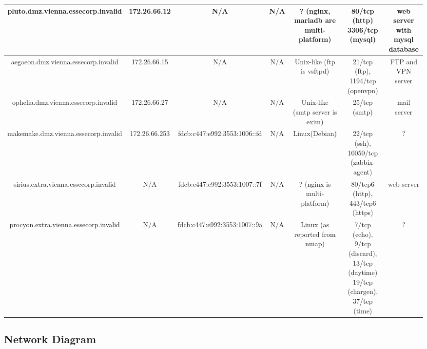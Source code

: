 \begin{center}
{\begin{tabular}{| c | c | c | c | c | c | c |}
        \hline
        pluto.dmz.vienna.essecorp.invalid       & 172.26.66.12   & N/A & N/A & ? (nginx, mariadb are multi-platform) & 80/tcp (http) 3306/tcp (mysql) & web server with mysql database \\
        \hline
        aegaeon.dmz.vienna.essecorp.invalid     & 172.26.66.15   & N/A & N/A & Unix-like (ftp is vsftpd) & 21/tcp (ftp), 1194/tcp (openvpn) & FTP and VPN server \\
        \hline
        ophelia.dmz.vienna.essecorp.invalid     & 172.26.66.27   & N/A & N/A & Unix-like (smtp server is exim) & 25/tcp (smtp) & mail server \\
        \hline
        makemake.dmz.vienna.essecorp.invalid    & 172.26.66.253  & fdcb:c447:e992:3553:1006::fd & N/A & Linux(Debian) & 22/tcp (ssh), 10050/tcp (zabbix-agent) & ? \\
        \hline
        sirius.extra.vienna.essecorp.invalid    & N/A & fdcb:c447:e992:3553:1007::7f & N/A & ? (nginx is multi-platform) & 80/tcp6 (http), 443/tcp6 (https) & web server \\
        \hline
        procyon.extra.vienna.essecorp.invalid   & N/A & fdcb:c447:e992:3553:1007::9a & N/A & Linux (as reported from nmap) & 7/tcp (echo), 9/tcp (discard), 13/tcp (daytime) 19/tcp (chargen), 37/tcp (time) & ? \\
        \hline
    \end{tabular}
    }
\end{center}

\subsection{Network Diagram}